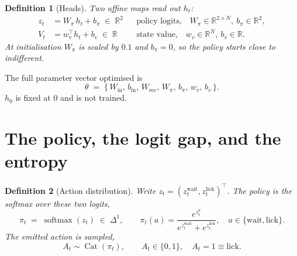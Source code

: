 \documentclass[11pt]{article}
\newtheorem{definition}{Definition}
\newcommand{\R}{\mathbb{R}}
\newcommand{\softmax}{\operatorname{softmax}}
\newcommand{\1}{\mathbf{1}}
\DeclareMathOperator{\Cat}{Cat}
\begin{document}
\begin{definition}[Heads]
Two affine maps read out $h_t$:
\begin{align}
  z_t &= W_{\pi}\, h_t + b_{\pi} \;\in\; \R^{2}
    && \text{policy logits,} \quad W_{\pi}\in\R^{2\times N},\ b_\pi\in\R^2, \label{eq:logits}\\
  V_t &= w_v^{\top} h_t + b_v \;\in\; \R
    && \text{state value,} \quad w_v\in\R^{N},\ b_v\in\R. \label{eq:value}
\end{align}
At initialisation $W_\pi$ is scaled by $0.1$ and $b_\pi = 0$, so the policy starts close to
indifferent.
\end{definition}

The full parameter vector optimised is
\begin{equation}
  \theta \;=\; \bigl\{\, W_{\mathrm{in}},\, b_{\mathrm{in}},\, W_{\mathrm{rec}},\,
                        W_{\pi},\, b_{\pi},\, w_v,\, b_v \,\bigr\}.
\end{equation}
$h_0$ is fixed at $0$ and is not trained.

\section{The policy, the logit gap, and the entropy}\label{sec:policy}

\begin{definition}[Action distribution]
Write $z_t = (z_t^{\mathrm{wait}}, z_t^{\mathrm{lick}})^{\!\top}$. The policy is the softmax
over these two logits,
\begin{equation}
  \pi_t \;=\; \softmax(z_t) \;\in\; \Delta^{1},
  \qquad
  \pi_t(a) = \frac{e^{z_t^{a}}}{e^{z_t^{\mathrm{wait}}} + e^{z_t^{\mathrm{lick}}}},
  \quad a \in \{\mathrm{wait},\mathrm{lick}\}.
\end{equation}
The emitted action is sampled,
\begin{equation}
  A_t \sim \Cat(\pi_t), \qquad A_t \in \{0,1\}, \quad A_t = 1 \equiv \mathrm{lick}.
\end{equation}
\end{definition}
\end{document}
